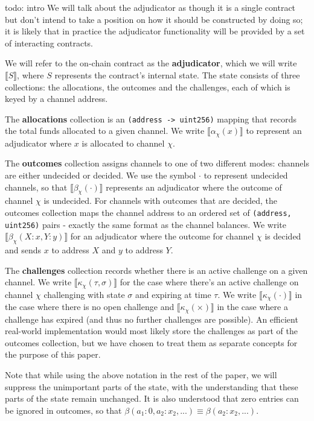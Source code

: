 \documentclass{article}
\theoremstyle{definition}
\newcommand{\adj}[1]{\llbracket #1 \rrbracket}
\begin{document}
todo: intro
We will talk about the adjudicator as though it is a single contract but don't intend to take a position on how it should be constructed by doing so; it is likely that in practice the adjudicator functionality will be provided by a set of interacting contracts.

We will refer to the on-chain contract as the \textbf{adjudicator}, which we will write $\adj{S}$, where $S$ represents the contract's internal state. The state consists of three collections: the allocations, the outcomes and the challenges, each of which is keyed by a channel address. 

The \textbf{allocations} collection is an \texttt{(address -> uint256)} mapping that records the total funds allocated to a given channel. We write $\adj{\alpha_\chi(x)}$ to represent an adjudicator where $x$ is allocated to channel $\chi$.

The \textbf{outcomes} collection assigns channels to one of two different modes: channels are either undecided or decided. We use the symbol $\cdot$ to represent undecided channels, so that $\adj{\beta_\chi(\cdot)}$ represents an adjudicator where the outcome of channel $\chi$ is undecided. For channels with outcomes that are decided, the outcomes collection maps the channel address to an ordered set of \texttt{(address, uint256)} pairs - exactly the same format as the channel balances. We write $\adj{\beta_\chi(X: x, Y: y)}$ for an adjudicator where the outcome for channel $\chi$ is decided and sends $x$ to address $X$ and $y$ to address $Y$.

The \textbf{challenges} collection records whether there is an active challenge on a given channel. We write $\adj{\kappa_\chi(\tau, \sigma)}$ for the case where there's an active challenge on channel $\chi$ challenging with state $\sigma$ and expiring at time $\tau$. We write $\adj{\kappa_\chi(\cdot)}$ in the case where there is no open challenge and $\adj{\kappa_\chi(\times)}$ in the case where a challenge has expired (and thus no further challenges are possible). An efficient real-world implementation would most likely store the challenges as part of the outcomes collection, but we have chosen to treat them as separate concepts for the purpose of this paper.

Note that while using the above notation in the rest of the paper, we will suppress the unimportant parts of the state, with the understanding that these parts of the state remain unchanged. It is also understood that zero entries can be ignored in outcomes, so that $\beta(a_1: 0, a_2:x_2,...) \equiv \beta(a_2:x_2, ...)$.
\end{document}
